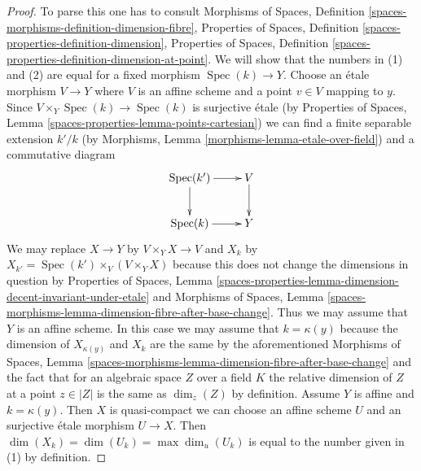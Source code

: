 \documentclass[10pt,a4paper]{amsart}
\theoremstyle{plain}
\theoremstyle{definition}
\theoremstyle{remark}
\numberwithin{equation}{subsection}
\def\Spec{\mathop{\mathrm{Spec}}}
\begin{document}
\begin{proof}
To parse this one has to consult
Morphisms of Spaces, Definition
\ref{spaces-morphisms-definition-dimension-fibre},
Properties of Spaces,
Definition \ref{spaces-properties-definition-dimension},
Properties of Spaces,
Definition \ref{spaces-properties-definition-dimension-at-point}.
We will show that the numbers in (1) and (2) are equal for
a fixed morphism $\Spec(k) \to Y$.
Choose an \'etale morphism $V \to Y$ where $V$ is an affine
scheme and a point $v \in V$ mapping to $y$.
Since $V \times_Y \Spec(k) \to \Spec(k)$ is surjective \'etale
(by Properties of Spaces, Lemma \ref{spaces-properties-lemma-points-cartesian})
we can find a finite separable extension $k'/k$
(by Morphisms, Lemma \ref{morphisms-lemma-etale-over-field})
and a commutative diagram
$$
\xymatrix{
\Spec(k') \ar[r] \ar[d] & V \ar[d] \\
\Spec(k) \ar[r] & Y
}
$$
We may replace $X \to Y$ by $V \times_Y X \to V$ and
$X_k$ by $X_{k'} = \Spec(k') \times_V (V \times_Y X)$
because this does not change the dimensions in question by
Properties of Spaces, Lemma
\ref{spaces-properties-lemma-dimension-decent-invariant-under-etale}
and Morphisms of Spaces, Lemma
\ref{spaces-morphisms-lemma-dimension-fibre-after-base-change}.
Thus we may assume that $Y$ is an affine scheme.
In this case we may assume that $k = \kappa(y)$
because the dimension of $X_{\kappa(y)}$ and $X_k$
are the same by the aforementioned Morphisms of Spaces, Lemma
\ref{spaces-morphisms-lemma-dimension-fibre-after-base-change}
and the fact that for an algebraic space $Z$ over a field $K$ the
relative dimension of $Z$ at a point $z \in |Z|$
is the same as $\dim_z(Z)$ by definition.
Assume $Y$ is affine and $k = \kappa(y)$. Then
$X$ is quasi-compact we can choose an affine scheme $U$ and
an surjective \'etale morphism $U \to X$.
Then $\dim(X_k) = \dim(U_k) = \max \dim_u(U_k)$
is equal to the number given in (1) by definition.
\end{proof}
\end{document}
